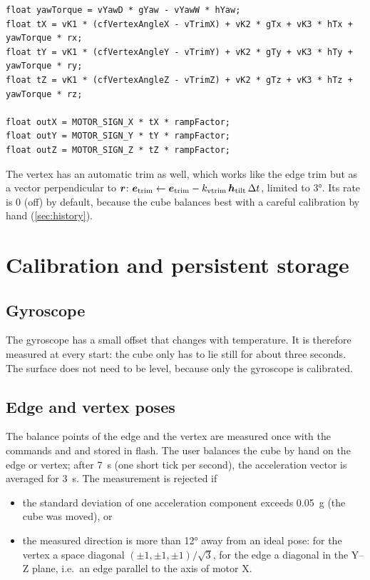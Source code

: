 \begin{lstlisting}[caption={Core of the vertex controller in \cmd{cubilox\_mk1.ino}.},
  label={lst:vertex}]
float yawTorque = vYawD * gYaw - vYawW * hYaw;
float tX = vK1 * (cfVertexAngleX - vTrimX) + vK2 * gTx + vK3 * hTx + yawTorque * rx;
float tY = vK1 * (cfVertexAngleY - vTrimY) + vK2 * gTy + vK3 * hTy + yawTorque * ry;
float tZ = vK1 * (cfVertexAngleZ - vTrimZ) + vK2 * gTz + vK3 * hTz + yawTorque * rz;

float outX = MOTOR_SIGN_X * tX * rampFactor;
float outY = MOTOR_SIGN_Y * tY * rampFactor;
float outZ = MOTOR_SIGN_Z * tZ * rampFactor;
\end{lstlisting}

The vertex has an automatic trim as well, which works like the edge trim but as a vector
perpendicular to $\bm{r}$:
$\bm{e}_\text{trim} \leftarrow \bm{e}_\text{trim} - k_\text{vtrim}\,\bm{h}_\text{tilt}\,\Delta t$,
limited to \ang{3}. Its rate  is 0 (off) by default, because the cube balances best
with a careful calibration by hand (\cref{sec:history}).

\section{Calibration and persistent storage}
\label{sec:calibration}

\subsection{Gyroscope}

The gyroscope has a small offset that changes with temperature. It is therefore measured at every
start: the cube only has to lie still for about three seconds. The surface does not need to be
level, because only the gyroscope is calibrated.

\subsection{Edge and vertex poses}

The balance points of the edge and the vertex are measured once with the commands  and
 and stored in flash. The user balances the cube by hand on the edge or vertex;
after \SI{7}{s} (one short tick per second), the acceleration vector is averaged for \SI{3}{s}.
The measurement is rejected if
\begin{itemize}
  \item the standard deviation of one acceleration component exceeds \SI{0.05}{g} (the cube was
        moved), or
  \item the measured direction is more than \ang{12} away from an ideal pose: for the vertex a
        space diagonal $(\pm 1, \pm 1, \pm 1)/\sqrt{3}$, for the edge a diagonal in the Y--Z plane,
        i.e.\ an edge parallel to the axis of motor X.
\end{itemize}

